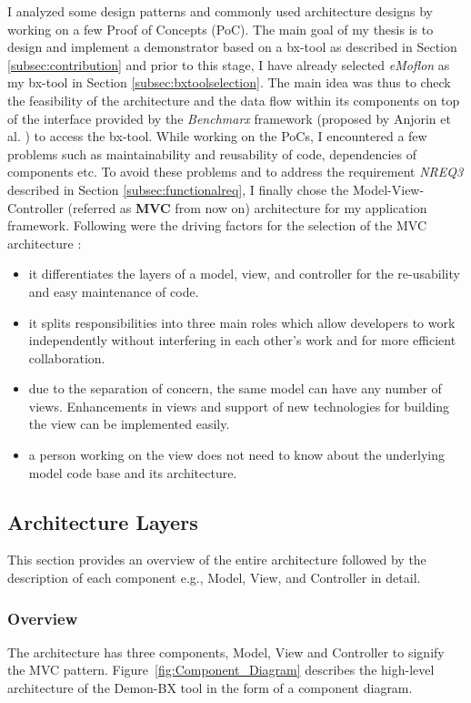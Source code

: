 I analyzed some design patterns and commonly used architecture designs by working on a few Proof of Concepts (PoC). The main goal of my thesis is to design and implement a demonstrator based on a bx-tool as described in Section \ref{subsec:contribution} and prior to this stage, I have already selected \textit{eMoflon} as my bx-tool in Section \ref{subsec:bxtoolselection}. The main idea was thus to check the feasibility of the architecture and the data flow within its components on top of the interface provided by the \textit{Benchmarx} framework (proposed by Anjorin et al. \cite{benchmarx-reload}) to access the bx-tool. While working on the PoCs, I encountered a few problems such as maintainability and reusability of code, dependencies of components etc. To avoid these problems and to address the requirement \textit{NREQ3} described in Section \ref{subsec:functionalreq}, I finally chose the Model-View-Controller (referred as \textbf{MVC} from now on) architecture for my application framework. Following were the driving factors for the selection of the MVC architecture \cite{designpattern-notes} \cite{designpattern-headfirst}:
\begin{itemize}
	\item {it differentiates the layers of a model, view, and controller for the re-usability and easy maintenance of code.}
	\item {it splits responsibilities into three main roles which allow developers to work independently without interfering in each other's work and for more efficient collaboration.}
	\item {due to the separation of concern, the same model can have any number of views. Enhancements in views and support of new technologies for building the view can be implemented easily.}
	\item {a person working on the view does not need to know about the underlying model code base and its architecture.}
\end{itemize}

\subsection{Architecture Layers}\label{subsec:design_layers}
This section provides an overview of the entire architecture followed by the description of each component e.g., Model, View, and Controller in detail.

\subsubsection{Overview}\label{subsubsec:design_overview}
The architecture has three components, Model, View and Controller to signify the MVC pattern. Figure~\ref{fig:Component_Diagram} describes the high-level architecture of the Demon-BX tool in the form of a component diagram.

